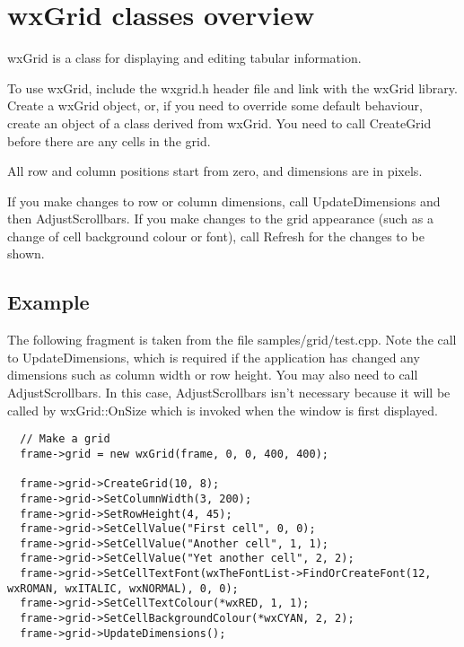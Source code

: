 \section{wxGrid classes overview}\label{gridoverview}

wxGrid is a class for displaying and editing tabular information.

To use wxGrid, include the wxgrid.h header file and link with the
wxGrid library. Create a wxGrid object, or, if you need to override
some default behaviour, create an object of a class derived from wxGrid.
You need to call CreateGrid before there are any cells in the grid.

All row and column positions start from zero, and dimensions are in pixels.

If you make changes to row or column dimensions, call UpdateDimensions and
then AdjustScrollbars. If you make changes to the grid appearance (such as
a change of cell background colour or font), call Refresh for the changes
to be shown.

\subsection{Example}

The following fragment is taken from the file samples/grid/test.cpp. Note the
call to UpdateDimensions, which is required if the application
has changed any dimensions such as column width or row height.
You may also need to call AdjustScrollbars. In this case, AdjustScrollbars
isn't necessary because it will be called by wxGrid::OnSize which is invoked
when the window is first displayed.

\begin{verbatim}
  // Make a grid
  frame->grid = new wxGrid(frame, 0, 0, 400, 400);

  frame->grid->CreateGrid(10, 8);
  frame->grid->SetColumnWidth(3, 200);
  frame->grid->SetRowHeight(4, 45);
  frame->grid->SetCellValue("First cell", 0, 0);
  frame->grid->SetCellValue("Another cell", 1, 1);
  frame->grid->SetCellValue("Yet another cell", 2, 2);
  frame->grid->SetCellTextFont(wxTheFontList->FindOrCreateFont(12, wxROMAN, wxITALIC, wxNORMAL), 0, 0);
  frame->grid->SetCellTextColour(*wxRED, 1, 1);
  frame->grid->SetCellBackgroundColour(*wxCYAN, 2, 2);
  frame->grid->UpdateDimensions();
\end{verbatim}

